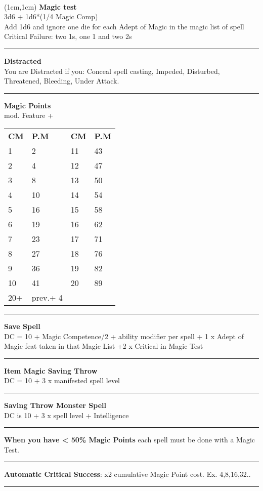 \documentclass[a4paper,12 pt,openany]{book}
\newcommand{\linex}{\rule{\textwidth}{0.4pt}}
\begin{document}
~\newpage

\begin{textblock*}{5cm}(1cm,1cm) %
\textbf{Magic test}\\
3d6 + 1d6*(1/4 Magic Comp)\\
Add 1d6 and ignore one die for each Adept of Magic in the magic list of spell\\
Critical Failure: two 1s, one 1 and two 2s\\


\linex

\textbf{Distracted}\\
You are Distracted if you: Conceal spell casting, Impeded, Disturbed, Threatened, Bleeding, Under Attack.\\

\linex

\textbf{Magic Points}\\
mod. Feature + \\

\begin{tabular}{ll|ll}
\textbf{CM} & \textbf{P.M}& \textbf{CM} & \textbf{P.M}\\
	1&	2 	&11&43\\
2&	4	&12&47\\
3&	8	&13&50\\
4&	10	&14&54\\
5&	16	&15&58\\
6&	19	&16&62\\
7&	23	&17&71\\
8&	27	&18&76\\
9&	36	&19&82\\
10&	41	&20&89\\
20+&prev.+ 4&&\\
\end{tabular}

\linex

\textbf{Save Spell}\\
DC = 10 + Magic Competence/2 + ability modifier per spell + 1 x Adept of Magic feat taken in that Magic List +2 x Critical in Magic Test

\linex

\textbf{Item Magic Saving Throw}\\
DC = 10 + 3 x manifested spell level

\linex

\textbf{Saving Throw Monster Spell}\\
DC is 10 + 3 x spell level + Intelligence

\linex

\textbf{When you have < 50\% Magic Points} each spell must be done with a Magic Test.

\linex

\textbf{Automatic Critical Success}: x2 cumulative Magic Point cost. Ex. 4,8,16,32..

\linex

\end{textblock*}
\end{document}
